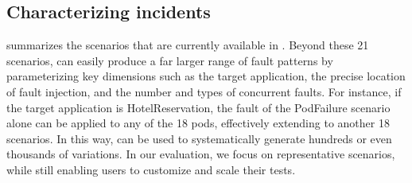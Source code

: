 \subsection{Characterizing \bench incidents}
\label{ss:sre:scenario_complexity}

 summarizes the scenarios that are currently available in \bench. Beyond these 21 scenarios, \bench can easily produce a far larger range of fault patterns by parameterizing key dimensions such as the target application, the precise location of fault injection, and the number and types of concurrent faults. For instance, if the target application is HotelReservation, the fault of the PodFailure scenario alone can be applied to any of the 18 pods, effectively extending to another 18 scenarios. In this way, \bench can be used to systematically generate hundreds or even thousands of variations. In our evaluation, we focus on representative scenarios, while still enabling users to customize and scale their tests. 
